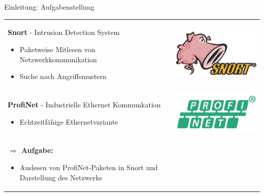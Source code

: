 \begin{frame}{Einleitung: Aufgabenstellung}
\begin{tabular}{m{8cm}r}
  \textbf{Snort} - Intrusion Detection System
    \begin{itemize}
      \item Paketweise Mitlesen von Netzwerkkommunikation
      \item Suche nach Angriffsmustern
    \end{itemize} & \includegraphics[width=0.2\linewidth]{images/max-snort} \\
  \pause
  \textbf{ProfiNet} - Industrielle Ethernet Kommunkation
    \begin{itemize}
      \item Echtzeitfähige Ethernetvariante
    \end{itemize} & \includegraphics[width=0.2\linewidth]{images/max-profinet} \\
  \pause
  \textbf{$\Rightarrow$ Aufgabe:}
  \begin{itemize}
    \item Auslesen von ProfiNet-Paketen in Snort und Darstellung des Netzwerks
  \end{itemize}
\end{tabular}
\end{frame}
